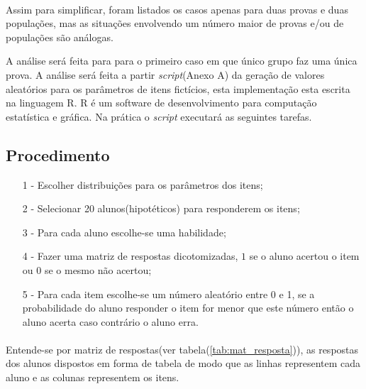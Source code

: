 	\paragraph{}
	    Assim para simplificar, foram listados os casos apenas para duas provas e duas populações, mas as situações envolvendo um número maior de provas e/ou de populações são análogas.
	\par
    	A análise será feita para para o primeiro caso em que único grupo faz uma única prova. A análise será feita a partir \textit{script}(Anexo  A) da geração de valores aleatórios para os parâmetros de itens fictícios, esta implementação esta escrita na linguagem R. R é um software de desenvolvimento para computação estatística e gráfica.
    	Na prática o \textit{script} executará as seguintes tarefas.
    \subsection{Procedimento}
	\begin{enumerate}
		\item[1 - ] Escolher distribuições para os parâmetros dos itens;
		\item[2 - ] Selecionar 20 alunos(hipotéticos) para responderem os itens;
		\item[3 - ] Para cada aluno escolhe-se uma habilidade;
		\item[4 - ] Fazer uma matriz de respostas dicotomizadas, $1$ se o aluno acertou o item ou $0$ se o mesmo não acertou;
		\item[5 - ] Para cada item escolhe-se um número aleatório entre 0 e 1, se a probabilidade do aluno responder o item for menor que este número então o aluno acerta caso contrário o aluno erra.
	\end{enumerate}
	\paragraph{}
	    Entende-se por matriz de respostas(ver tabela(\ref{tab:mat_resposta})), as respostas dos alunos dispostos em forma de tabela de modo que as linhas representem cada aluno e as colunas representem os itens.
